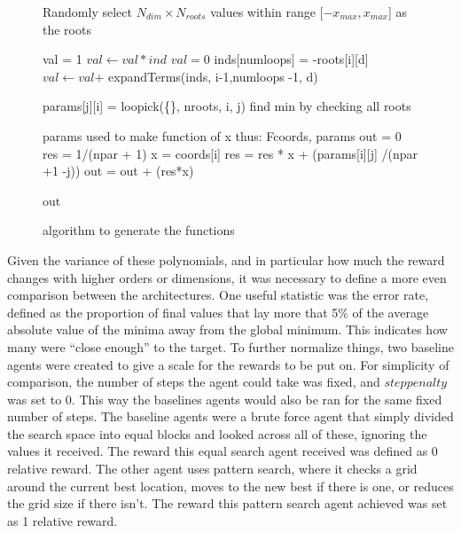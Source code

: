 \begin{figure}
\begin{algorithmic}
\State Randomly select  $N_{dim}\times N_{roots}$ values within range [$-x_{max}, x_{max}$] as the roots

               \State val = 1
                    \State$ val \gets val*ind$
                \EndFor
               \State {}
            \Else
                \State $val = 0$
                    \State inds[numloops] = -roots[i][d]  
                    \State$ val \gets val $+ expandTerms(inds, i-1,numloops -1, d) 
                \EndFor
                \State {}
            \EndIf
      \EndFunction
        
            \State params[j][i] = loopick(\{\}, nroots, i, j)
        \EndFor
    \EndFor
   \State find min by checking all roots
    
  \State params used to make function of x thus:
  \Function F{coords, params}
    \State out = 0
         \State res = 1/(npar + 1) 
        \State x = coords[i]
              \State res = res * x + (params[i][j] /(npar +1 -j))
	    \EndFor
	   \State out =  out + (res*x)
    \EndFor

    \Return out
\EndFunction
\end{algorithmic}
\caption{algorithm to generate the functions}
\label{alg:functiongen}
\end{figure}

Given the variance of these polynomials, and in particular how much the reward changes with higher orders or dimensions, it was necessary to define a more even comparison between the architectures. One useful statistic was the error rate, defined as the proportion of final values that lay more that 5\% of the average absolute value of the minima away from the global minimum. This indicates how many were ``close enough'' to the target. To further normalize things, two baseline agents were created to give a scale for the rewards to be put on. For simplicity of comparison, the number of steps the agent could take was fixed, and $steppenalty$ was set to 0. This way the baselines agents would also be ran for the same fixed number of steps. The baseline agents were a brute force agent that simply divided the search space into equal blocks and looked across all of these, ignoring the values it received. The reward this equal search agent received was defined as 0 relative reward. The other agent uses pattern search, where it checks a grid around the current best location, moves to the new best if there is one, or reduces the grid size if there isn't. The reward this pattern search agent achieved was set as 1 relative reward.

